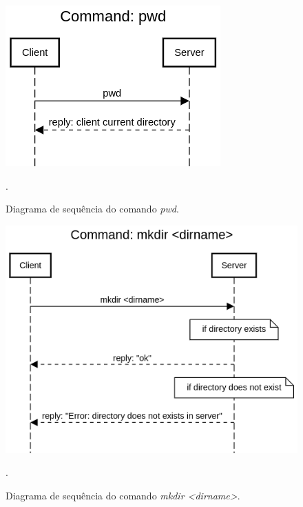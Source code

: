 \documentclass[conference]{IEEEtran}
\begin{document}
\begin{figure}[H]
\centering
\centerline{\includegraphics[scale=0.4]{diagrams/Command_pwd.png}}
\caption{Diagrama de sequência do comando \textit{pwd}.}.
\label{pwd}
\end{figure}

\begin{figure}[H]
\centering
\centerline{\includegraphics[scale=0.4]{diagrams/Command_mkdir_dirname.png}}
\caption{Diagrama de sequência do comando \textit{mkdir <dirname>}.}.
\label{mkdir}
\end{figure}
\end{document}
